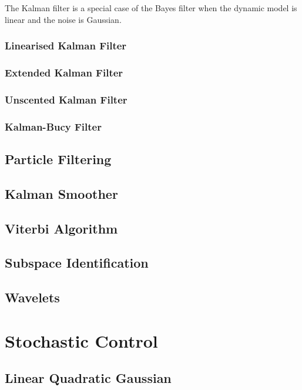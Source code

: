 \documentclass[11pt]{report} %
\begin{document}
The Kalman filter is a special case of the Bayes filter when the dynamic model is linear and the noise is Gaussian.

\subsection{Linearised Kalman Filter}

\subsection{Extended Kalman Filter}

\subsection{Unscented Kalman Filter}

\subsection{Kalman-Bucy Filter}

\section{Particle Filtering}

\section{Kalman Smoother}

\section{Viterbi Algorithm}

\section{Subspace Identification}

\section{Wavelets}

\chapter{Stochastic Control}

\section{Linear Quadratic Gaussian}
\end{document}
